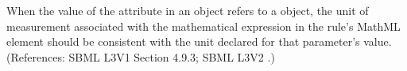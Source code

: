 When the value of the attribute  in an \AssignmentRule
object refers to a \Parameter object, the unit of measurement associated
with the mathematical expression in the rule's MathML  element
should be consistent with the unit declared for that parameter's value.
(References: SBML L3V1 Section 4.9.3; SBML L3V2 .)
